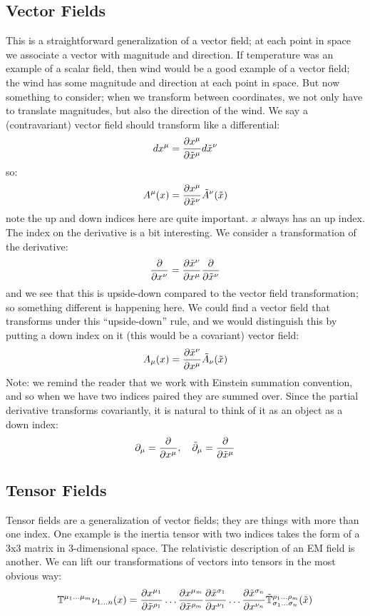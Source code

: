 \subsection{Vector Fields}
This is a straightforward generalization of a vector field; at each point in space we associate a vector with magnitude and direction. If temperature was an example of a scalar field, then wind would be a good example of a vector field; the wind has some magnitude and direction at each point in space. But now something to consider; when we transform between coordinates, we not only have to translate magnitudes, but also the direction of the wind. We say a (contravariant) vector field should transform like a differential:
\begin{equation}
    dx^\mu = \frac{\partial x^\mu}{\partial \tilde{x}^\mu}d\tilde{x}^\nu
\end{equation}
so:
\begin{equation}
    A^\mu(x) = \frac{\partial x^\mu}{\partial \tilde{x}^\nu}\tilde{A}^\nu(\tilde{x})
\end{equation}
note the up and down indices here are quite important. $x$ always has an up index. The index on the derivative is a bit interesting. We consider a transformation of the derivative:
\begin{equation}
    \frac{\partial }{\partial x^\nu} = \frac{\partial \tilde{x}^\nu}{\partial x^\mu}\frac{\partial }{\partial \tilde{x}^\nu}
\end{equation}
and we see that this is upside-down compared to the vector field transformation; so something different is happening here. We could find a vector field that transforms under this ``upside-down'' rule, and we would distinguish this by putting a down index on it (this would be a covariant) vector field:
\begin{equation}
    A_\mu(x) = \frac{\partial \tilde{x}^\nu}{\partial x^\mu}\tilde{A}_\nu(\tilde{x})
\end{equation}
Note: we remind the reader that we work with Einstein summation convention, and so when we have two indices paired they are summed over. Since the partial derivative transforms covariantly, it is natural to think of it as an object as a down index:
\begin{equation}
    \partial_\mu = \frac{\partial }{\partial x^\mu}, \quad \tilde{\partial}_\mu = \frac{\partial }{\partial \tilde{x}^\mu}
\end{equation}

\subsection{Tensor Fields}
Tensor fields are a generalization of vector fields; they are things with more than one index. One example is the inertia tensor with two indices takes the form of a 3x3 matrix in 3-dimensional space. The relativistic description of an EM field is another. We can lift our transformations of vectors into tensors in the most obvious way:
\begin{equation}
    \mathbb{T}^{\mu_1 \ldots \mu_m}\nu_{1 \ldots n}(x) = \frac{\partial x^{\mu_1}}{\partial \tilde{x}^{\rho_1}}\ldots \frac{\partial x^{\mu_m}}{\partial \tilde{x}^{\rho_m}} \frac{\partial \tilde{x}^{\sigma_1}}{\partial x^{\nu_1}}\ldots \frac{\partial \tilde{x}^{\sigma_n}}{\partial x^{\nu_n}}\tilde{\mathbb{T}}^{\rho_1 \ldots \rho_m}_{\sigma_1 \ldots \sigma_n}(\tilde{x})
\end{equation}


